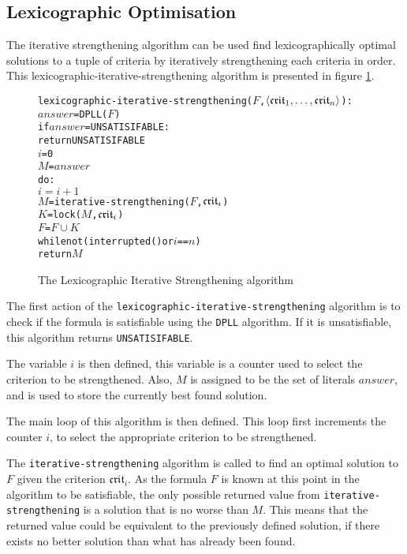 \subsection{Lexicographic Optimisation}
\label{impl.lexiterstre}
The iterative strengthening algorithm can be used find lexicographically optimal solutions to a tuple of criteria by iteratively strengthening each criteria in order.
This lexicographic-iterative-strengthening algorithm is presented in figure \ref{impl.lexstrength}.

\begin{figure}[htp]
\begin{center}
\begin{alltt}
lexicographic-iterative-strengthening(\(F\),\(\langle{}\mathfrak{crit}\sb{1}, \ldots ,\mathfrak{crit}\sb{n}\rangle\)):  
    \(answer\) = DPLL(\(F\))
    if \(answer\) = UNSATISIFABLE:
        return UNSATISIFABLE
    \(i\) = 0
    \(M\) = \(answer\)
    do:
        \(i = i + 1\)
        \(M\) = iterative-strengthening(\(F\),\(\mathfrak{crit}\sb{i}\))
        \(K\) = lock(\(M\),\(\mathfrak{crit}\sb{i}\))
        \(F\) = \(F \cup K\)
    while not (interrupted() or \(i\) == \(n\))
    return \(M\) 
\end{alltt}
  \caption{The Lexicographic Iterative Strengthening algorithm}
  \label{impl.lexstrength}
\end{center}
\end{figure}

The first action of the \texttt{lexicographic-iterative-strengthening} algorithm is to check if the formula is satisfiable using the \texttt{DPLL} algorithm.
If it is unsatisfiable, this algorithm returns \texttt{UNSATISIFABLE}.

The variable $i$ is then defined, this variable is a counter used to select the criterion to be strengthened.
Also, $M$ is assigned to be the set of literals $answer$, and is used to store the currently best found solution.

The main loop of this algorithm is then defined.
This loop first increments the counter $i$, to select the appropriate criterion to be strengthened.

The \texttt{iterative-strengthening} algorithm is called to find an optimal solution to $F$ given the criterion $\mathfrak{crit}_i$.
As the formula $F$ is known at this point in the algorithm to be satisfiable, the only possible returned value from \texttt{iterative-strengthening}
is a solution that is no worse than $M$.
This means that the returned value could be equivalent to the previously defined solution, if there exists no better solution than what has already been found.

